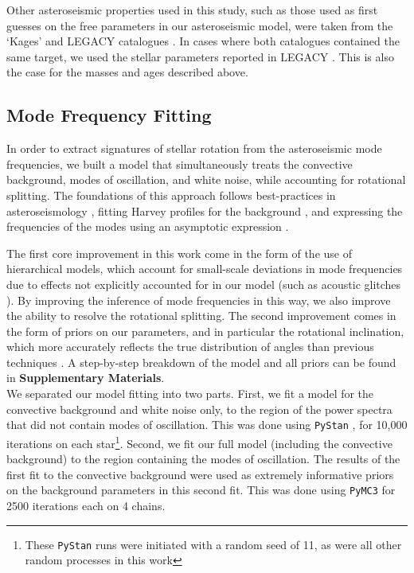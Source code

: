 Other asteroseismic properties used in this study, such as those used as first guesses on the free parameters in our asteroseismic model, were taken from the `Kages' and LEGACY catalogues \cite{astropycollaboration+2013, astropycollaboration+2018, ginsburg+2019}. In cases where both catalogues contained the same target, we used the stellar parameters reported in LEGACY \cite{mckinney2010}. This is also the case for the masses and ages described above.

\subsection{Mode Frequency Fitting}

In order to extract signatures of stellar rotation from the asteroseismic mode frequencies, we built a model that simultaneously treats the convective background, modes of oscillation, and white noise, while accounting for rotational splitting. The foundations of this approach follows best-practices in asteroseismology \cite{davies+2015}, fitting Harvey profiles for the background \cite{harvey1985}, and expressing the frequencies of the modes using an asymptotic expression \cite{tassoul1980, vrard+2016}.

The first core improvement in this work come in the form of the use of hierarchical models, which account for small-scale deviations in mode frequencies due to effects not explicitly accounted for in our model (such as acoustic glitches \cite{mazumdar+2014}). By improving the inference of mode frequencies in this way, we also improve the ability to resolve the rotational splitting. The second improvement comes in the form of priors on our parameters, and in particular the rotational inclination, which more accurately reflects the true distribution of angles than previous techniques \cite{chaplin+basu2017}. A step-by-step breakdown of the model and all priors can be found in \textbf{Supplementary Materials}.\\

We separated our model fitting into two parts. First, we fit a model for the convective background and white noise only, to the region of the power spectra that did not contain modes of oscillation. This was done using \texttt{PyStan} \cite{vanhoey+2013,carpenter+2017}, for 10,000 iterations on each star\footnote{These \texttt{PyStan} runs were initiated with a random seed of 11, as were all other random processes in this work}. Second, we fit our full model (including the convective background) to the region containing the modes of oscillation. The results of the first fit to the convective background were used as extremely informative priors on the background parameters in this second fit. This was done using \texttt{PyMC3} \cite{vanderwalt+2011,salvatier+2016, thetheanodevelopmentteam+2016} for 2500 iterations each on 4 chains.

